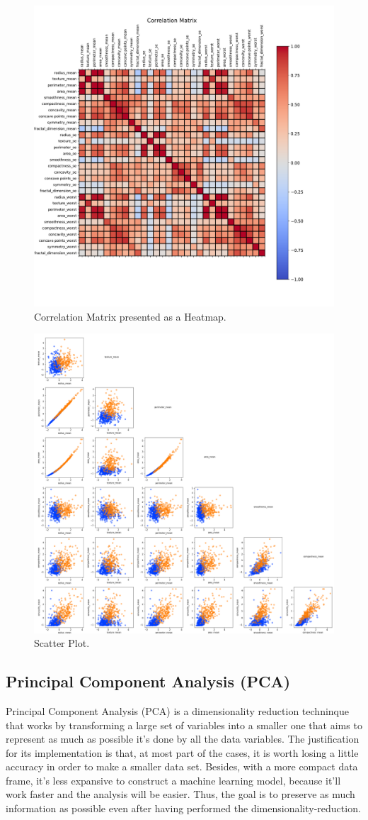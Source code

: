 \documentclass[conference]{IEEEtran}
\begin{document}
\begin{figure}[htbp!]
    \centerline{\includegraphics[width=0.5 \textwidth]{../../code/hw1/figures/4-3-correlation.pdf}}
    \caption{Correlation Matrix presented as a Heatmap.}
    \label{fig:4-3-correlation}
\end{figure}

\begin{figure}[htbp!]
    \centerline{\includegraphics[width=0.5 \textwidth]{../../code/hw1/figures/4-1-scatter-plot-clip.png}}
    \caption{Scatter Plot.}
    \label{fig:4-1-scatter-plot}
\end{figure}

\clearpage

\subsection{Principal Component Analysis (PCA)}

\cite{James2013, Ringner2001, Hastie2009, Kuhn2013}

Principal Component Analysis (PCA) is a dimensionality reduction techninque that works by transforming a large set of variables into a smaller one that aims to represent as much as possible it's done by all the data variables. The justification for its implementation is that, at most part of the cases, it is worth losing a little accuracy in order to make a smaller data set. Besides, with a more compact data frame, it's less expansive to construct a machine learning model, because it'll work faster and the analysis will be easier. Thus, the goal is to preserve as much information as possible even after having performed the dimensionality-reduction.
\end{document}

